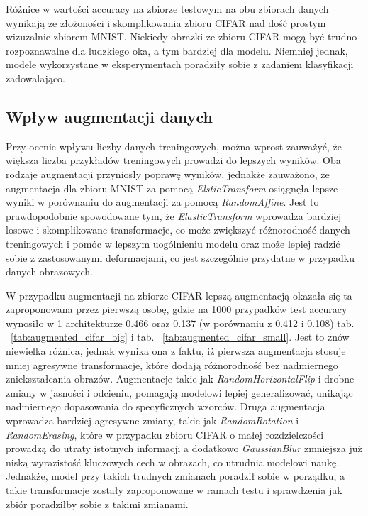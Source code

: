 \documentclass[10pt]{article}
\begin{document}
Różnice w wartości accuracy na zbiorze testowym na obu zbiorach danych wynikają ze złożoności i skomplikowania zbioru CIFAR nad dość prostym wizuzalnie zbiorem MNIST\@.
Niekiedy obrazki ze zbioru CIFAR mogą być trudno rozpoznawalne dla ludzkiego oka, a tym bardziej dla modelu.
Niemniej jednak, modele wykorzystane w eksperymentach poradziły sobie z zadaniem klasyfikacji zadowalająco.

\subsection*{Wpływ augmentacji danych}
Przy ocenie wpływu liczby danych treningowych, można wprost zauważyć, że większa liczba przykładów treningowych prowadzi do lepszych wyników.
Oba rodzaje augmentacji przyniosły poprawę wyników, jednakże zauważono, że augmentacja dla zbioru MNIST za pomocą \textit{ElsticTransform} osiągnęła lepsze wyniki w porównaniu do augmentacji za pomocą \textit{RandomAffine}.
Jest to prawdopodobnie spowodowane tym, że \textit{ElasticTransform} wprowadza bardziej losowe i skomplikowane transformacje, co może zwiększyć różnorodność danych treningowych i pomóc w lepszym uogólnieniu modelu oraz może lepiej radzić sobie z zastosowanymi deformacjami, co jest szczególnie przydatne w przypadku danych obrazowych.

W przypadku augmentacji na zbiorze CIFAR lepszą augmentacją okazała się ta zaproponowana przez pierwszą osobę, gdzie na 1000 przypadków test accuracy wynosiło w 1 architekturze 0.466 oraz 0.137 (w porównaniu z 0.412 i 0.108) tab. ~\ref{tab:augmented_cifar_big} i tab. ~\ref{tab:augmented_cifar_small}.
Jest to znów niewielka różnica, jednak wynika ona z faktu, iż pierwsza augmentacja stosuje mniej agresywne transformacje, które dodają różnorodność bez nadmiernego zniekształcania obrazów.
Augmentacje takie jak \textit{RandomHorizontalFlip} i drobne zmiany w jasności i odcieniu, pomagają modelowi lepiej generalizować, unikając nadmiernego dopasowania do specyficznych wzorców.
Druga augmentacja wprowadza bardziej agresywne zmiany, takie jak \textit{RandomRotation} i \textit{RandomErasing}, które w przypadku zbioru CIFAR o małej rozdzielczości prowadzą do utraty istotnych informacji a dodatkowo \textit{GaussianBlur} zmniejsza już niską wyrazistość kluczowych cech w obrazach, co utrudnia modelowi naukę.
Jednakże, model przy takich trudnych zmianach poradził sobie w porządku, a takie transformacje zostały zaproponowane w ramach testu i sprawdzenia jak zbiór poradziłby sobie z takimi zmianami.
\end{document}
